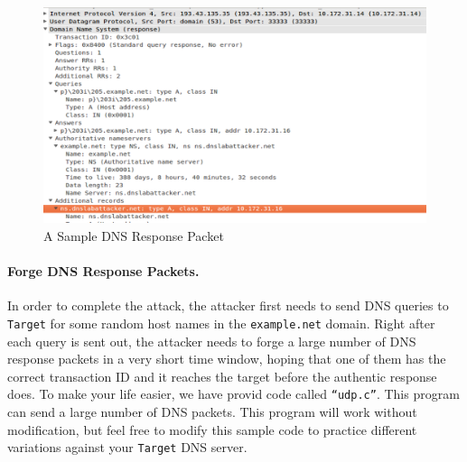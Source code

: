 \begin{figure}[!htb]
\centering
\includegraphics*[width=1.0\textwidth]{screenshot_packet1.png}
\caption{A Sample DNS Response Packet}
\label{fig:response_packet}
\end{figure}




\paragraph{Forge DNS Response Packets.}
In order to complete the attack, the attacker first needs to send 
DNS queries to {\tt Target} for some random host names in
the {\tt example.net} domain. Right after each query is sent out, 
the attacker needs to forge a large number of DNS response packets in a
very short time window,
hoping that one of them has the correct transaction ID and it reaches the target before 
the authentic response does.
To make your life easier, we have provid code called {\tt “udp.c”}. 
This program can send a large number of DNS packets. This program will work without modification, but feel free to modify this
sample code to practice different variations against your {\tt Target} DNS server.

